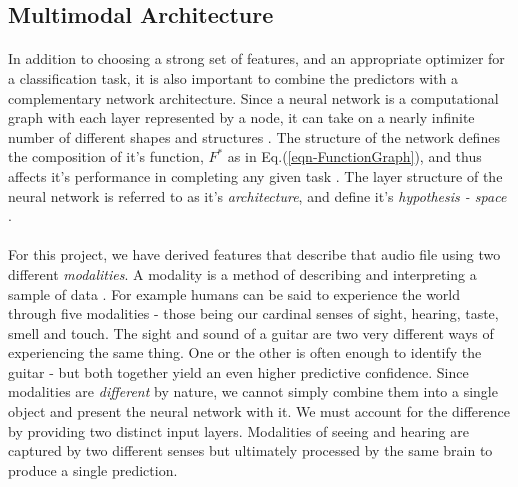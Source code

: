 \documentclass[12pt,letterpaper]{article}
\begin{document}

\subsection{Multimodal Architecture}
\label{subsec-Architecture}

\paragraph*{}In addition to choosing a strong set of features, and an appropriate optimizer for a classification task, it is also important to combine the predictors with a complementary network architecture. Since a neural network is a computational graph with each layer represented by a node, it can take on a nearly infinite number of different shapes and structures \cite{Goodfellow,Virtanen}. The structure of the network defines the composition of it's function, $F^*$ as in Eq.(\ref{eqn-FunctionGraph}), and thus affects it's performance in completing any given task \cite{Geron}. The layer structure of the neural network is referred to as it's \textit{architecture}, and define it's \textit{hypothesis - space} \cite{Goodfellow}. 

\paragraph*{}For this project, we have derived features that describe that audio file using two different \textit{modalities}. A modality is a method of describing and interpreting a sample of data \cite{Ngiam}. For example humans can be said to experience the world through five modalities - those being our cardinal senses of sight, hearing, taste, smell and touch. The sight and sound of a guitar are two very different ways of experiencing the same thing. One or the other is often enough to identify the guitar - but both together yield an even higher predictive confidence. Since modalities are \textit{different} by nature, we cannot simply combine them into a single object and present the neural network with it. We must account for the difference by providing two distinct input layers.  Modalities of seeing and hearing are captured by two different senses but ultimately processed by the same brain to produce a single prediction.
\end{document}
